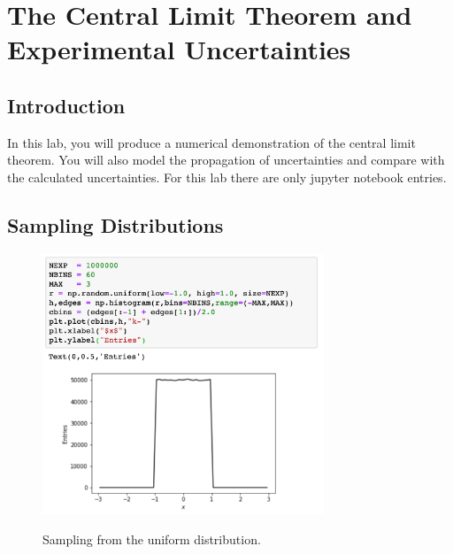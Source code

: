 \chapter{The Central Limit Theorem and Experimental Uncertainties}

%
%

\section{Introduction}

In this lab, you will produce a numerical demonstration of the central
limit theorem.  You will also model the propagation of uncertainties
and compare with the calculated uncertainties. For this lab there are only jupyter notebook entries. 


\section{Sampling Distributions}

\begin{figure}[htbp]
\begin{center}
\includegraphics[width=0.75\textwidth]{figs/labs/uncertainties/step.png}\\
\end{center}
\caption{\label{fig:samplingstep} Sampling from the uniform distribution. }
\end{figure}


